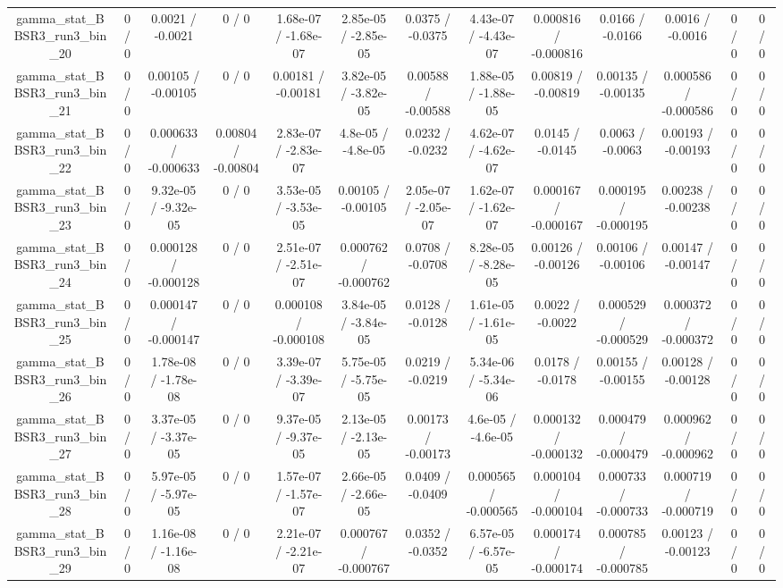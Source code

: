 \documentclass[10pt]{article}
\begin{document}
\begin{table}[htbp]
\begin{center}
\begin{tabular}{|c|c|c|c|c|c|c|c|c|c|c|c|c|}
  gamma_stat_BBSR3_run3_bin_20 & 0 / 0 & 0.0021 / -0.0021 & 0 / 0 & 1.68e-07 / -1.68e-07 & 2.85e-05 / -2.85e-05 & 0.0375 / -0.0375 & 4.43e-07 / -4.43e-07 & 0.000816 / -0.000816 & 0.0166 / -0.0166 & 0.0016 / -0.0016 & 0 / 0 & 0 / 0 \\ 
  gamma_stat_BBSR3_run3_bin_21 & 0 / 0 & 0.00105 / -0.00105 & 0 / 0 & 0.00181 / -0.00181 & 3.82e-05 / -3.82e-05 & 0.00588 / -0.00588 & 1.88e-05 / -1.88e-05 & 0.00819 / -0.00819 & 0.00135 / -0.00135 & 0.000586 / -0.000586 & 0 / 0 & 0 / 0 \\ 
  gamma_stat_BBSR3_run3_bin_22 & 0 / 0 & 0.000633 / -0.000633 & 0.00804 / -0.00804 & 2.83e-07 / -2.83e-07 & 4.8e-05 / -4.8e-05 & 0.0232 / -0.0232 & 4.62e-07 / -4.62e-07 & 0.0145 / -0.0145 & 0.0063 / -0.0063 & 0.00193 / -0.00193 & 0 / 0 & 0 / 0 \\ 
  gamma_stat_BBSR3_run3_bin_23 & 0 / 0 & 9.32e-05 / -9.32e-05 & 0 / 0 & 3.53e-05 / -3.53e-05 & 0.00105 / -0.00105 & 2.05e-07 / -2.05e-07 & 1.62e-07 / -1.62e-07 & 0.000167 / -0.000167 & 0.000195 / -0.000195 & 0.00238 / -0.00238 & 0 / 0 & 0 / 0 \\ 
  gamma_stat_BBSR3_run3_bin_24 & 0 / 0 & 0.000128 / -0.000128 & 0 / 0 & 2.51e-07 / -2.51e-07 & 0.000762 / -0.000762 & 0.0708 / -0.0708 & 8.28e-05 / -8.28e-05 & 0.00126 / -0.00126 & 0.00106 / -0.00106 & 0.00147 / -0.00147 & 0 / 0 & 0 / 0 \\ 
  gamma_stat_BBSR3_run3_bin_25 & 0 / 0 & 0.000147 / -0.000147 & 0 / 0 & 0.000108 / -0.000108 & 3.84e-05 / -3.84e-05 & 0.0128 / -0.0128 & 1.61e-05 / -1.61e-05 & 0.0022 / -0.0022 & 0.000529 / -0.000529 & 0.000372 / -0.000372 & 0 / 0 & 0 / 0 \\ 
  gamma_stat_BBSR3_run3_bin_26 & 0 / 0 & 1.78e-08 / -1.78e-08 & 0 / 0 & 3.39e-07 / -3.39e-07 & 5.75e-05 / -5.75e-05 & 0.0219 / -0.0219 & 5.34e-06 / -5.34e-06 & 0.0178 / -0.0178 & 0.00155 / -0.00155 & 0.00128 / -0.00128 & 0 / 0 & 0 / 0 \\ 
  gamma_stat_BBSR3_run3_bin_27 & 0 / 0 & 3.37e-05 / -3.37e-05 & 0 / 0 & 9.37e-05 / -9.37e-05 & 2.13e-05 / -2.13e-05 & 0.00173 / -0.00173 & 4.6e-05 / -4.6e-05 & 0.000132 / -0.000132 & 0.000479 / -0.000479 & 0.000962 / -0.000962 & 0 / 0 & 0 / 0 \\ 
  gamma_stat_BBSR3_run3_bin_28 & 0 / 0 & 5.97e-05 / -5.97e-05 & 0 / 0 & 1.57e-07 / -1.57e-07 & 2.66e-05 / -2.66e-05 & 0.0409 / -0.0409 & 0.000565 / -0.000565 & 0.000104 / -0.000104 & 0.000733 / -0.000733 & 0.000719 / -0.000719 & 0 / 0 & 0 / 0 \\ 
  gamma_stat_BBSR3_run3_bin_29 & 0 / 0 & 1.16e-08 / -1.16e-08 & 0 / 0 & 2.21e-07 / -2.21e-07 & 0.000767 / -0.000767 & 0.0352 / -0.0352 & 6.57e-05 / -6.57e-05 & 0.000174 / -0.000174 & 0.000785 / -0.000785 & 0.00123 / -0.00123 & 0 / 0 & 0 / 0 \\ 

\end{tabular}
\end{center}
\end{table}
\end{document}
